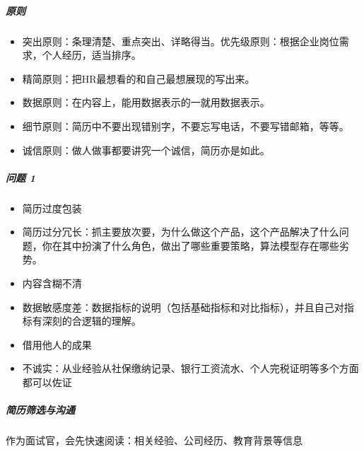 \documentclass[letterpaper,10pt,english]{sphinxmanual}
\begin{document}
\subparagraph{原则}
\label{\detokenize{chapter_interview/CV:id5}}\begin{itemize}
\item {} 
突出原则：条理清楚、重点突出、详略得当。优先级原则：根据企业岗位需求，个人经历，适当排序。

\item {} 
精简原则：把HR最想看的和自己最想展现的写出来。

\item {} 
数据原则：在内容上，能用数据表示的一就用数据表示。

\item {} 
细节原则：简历中不要出现错别字，不要忘写电话，不要写错邮箱，等等。

\item {} 
诚信原则：做人做事都要讲究一个诚信，简历亦是如此。%
\begin{footnote}[844]\sphinxAtStartFootnote
{}
%
\end{footnote}

\end{itemize}


\subparagraph{问题 1\sphinxfootnotemark[845]}
\label{\detokenize{chapter_interview/CV:id6}}%
\begin{footnotetext}[845]\sphinxAtStartFootnote
{}
%
\end{footnotetext}\ignorespaces \begin{itemize}
\item {} 
简历过度包装

\item {} 
简历过分冗长：抓主要放次要，为什么做这个产品，这个产品解决了什么问题，你在其中扮演了什么角色，做出了哪些重要策略，算法模型存在哪些劣势。

\item {} 
内容含糊不清

\item {} 
数据敏感度差：数据指标的说明（包括基础指标和对比指标），并且自己对指标有深刻的合逻辑的理解。

\item {} 
借用他人的成果

\item {} 
不诚实：从业经验从社保缴纳记录、银行工资流水、个人完税证明等多个方面都可以佐证

\end{itemize}


\subparagraph{简历筛选与沟通}
\label{\detokenize{chapter_interview/CV:id7}}
作为面试官，会先快速阅读：相关经验、公司经历、教育背景等信息
\end{document}
